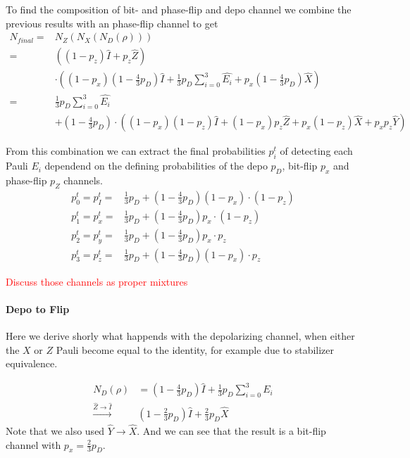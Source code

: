 To find the composition of bit- and phase-flip and depo channel 
we combine the previous results with an phase-flip channel to get 
\begin{align*}
    N_{final} =&N_Z(N_X(N_D(\rho))) \\
    =& \left((1-p_z)\hat{I} + p_z \hat{Z}\right) \\
    & \cdot \left((1-p_x)\left(1-\frac{4}{3}p_D\right) \hat{I} + \frac{1}{3} p_D \sum_{i=0}^{3}\hat{E_i}  + p_x\left(1-\frac{4}{3}p_D\right) \hat{X}\right) \\
    =& \frac{1}{3} p_D \sum_{i=0}^{3} \hat{E_i} \\
    &+ \left(1-\frac{4}{3}p_D \right)\cdot\left((1-p_x)(1-p_z) \hat{I}+ (1-p_x) p_z \hat{Z} + p_x (1-p_z) \hat{X} + p_x p_z \hat{Y}\right)
\end{align*}

From this combination we can extract the final probabilities $p_{i}^t$ of detecting each Pauli $E_i$ 
dependend on the defining probabilities of the depo $p_D$, bit-flip $p_x$ and phase-flip $p_Z$ channels.
\begin{align}
    p_0^t = p_I^t =& \frac{1}{3} p_D + \left( 1-\frac{4}{3}p_D\right) (1-p_x)\cdot(1-p_z) \label{eq:total_comp_I}\\
    p_1^t = p_x^t =& \frac{1}{3} p_D + \left( 1-\frac{4}{3}p_D\right) p_x \cdot(1-p_z) \label{eq:total_comp_X}\\
    p_2^t = p_y^t =& \frac{1}{3} p_D + \left( 1-\frac{4}{3}p_D\right) p_x\cdot p_z\label{eq:total_comp_Y}\\
    p_3^t = p_z^t =& \frac{1}{3} p_D + \left( 1-\frac{4}{3}p_D\right) (1-p_x)\cdot p_z\label{eq:total_comp_Z} 
\end{align}

\textcolor{red}{Discuss those channels as proper mixtures}

\paragraph{Depo to Flip}\label{para:depo_to_flip}
Here we derive shorly what happends with the depolarizing channel, 
when either the $X$ or $Z$ Pauli become equal to the identity,
for example due to stabilizer equivalence.

\begin{align*}
    N_D (\rho) &= \left(1-\frac{4}{3}p_D\right) \hat{I} + \frac{1}{3} p_D \sum_{i=0}^{3} E_i \\
    \overset{\hat{Z} \rightarrow \hat{I}}{\rightarrow} & \left( 1- \frac{2}{3}p_D \right) \hat{I}+ \frac{2}{3} p_D \hat{X}
\end{align*}
Note that we also used $\hat{Y} \rightarrow \hat{X}$.
And we can see that the result is a bit-flip channel with $p_x = \frac{2}{3} p_D$.



